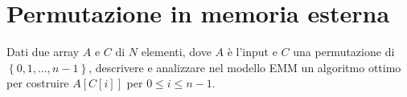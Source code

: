 \chapter{Permutazione in memoria esterna}

\begin{problem*}
    Dati due array \(A\) e \(C\) di \(N\) elementi, dove \(A\) \`e l'input e 
    \(C\) una permutazione di \(\left\{0,1,\dots ,n-1\right\}\), descrivere e
    analizzare nel modello EMM un algoritmo ottimo per costruire \(A[C[i]]\)
    per \(0\le i\le n-1\).
\end{problem*}
